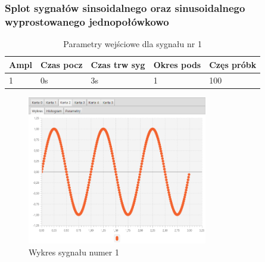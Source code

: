 \documentclass[12pt]{article}
\begin{document}
{{            \subsubsection{Splot sygnałów sinsoidalnego oraz sinusoidalnego wyprostowanego
            jednopołówkowo} \label{eksperyment:splot2}{

                \begin{table}[H]
                    \centering
                    \begin{tabular}{|l|l|l|l|l|}
                        \hline
                        Ampl & Czas pocz & Czas trw syg & Okres pods & Częs próbk   \\ \hline
                        1 & 0s & 3s & 1 & 100           \\ \hline
                    \end{tabular}
                    \caption{Parametry wejściowe dla sygnału nr 1}
                \end{table}
                \begin{figure}[H]
                    \centering
                    \includegraphics[width=0.7\textwidth]{img/result/convolution/experiment2/data_122746.png}
                    \caption{Wykres sygnału numer 1}
                \end{figure}

}}}
\end{document}
